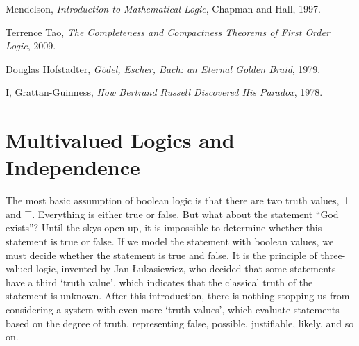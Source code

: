 \begin{thebibliography}{9}

    Mendelson,
    \emph{Introduction to Mathematical Logic},
    Chapman and Hall,
    1997.

    Terrence Tao,
    \emph{The Completeness and Compactness Theorems of First Order Logic},
    2009.

    Douglas Hofstadter,
    \emph{G\"{o}del, Escher, Bach: an Eternal Golden Braid},
    1979.

    I, Grattan-Guinness,
    \emph{How Bertrand Russell Discovered His Paradox},
    1978.

\end{thebibliography}



















\section{Multivalued Logics and Independence}

The most basic assumption of boolean logic is that there are two truth values, $\bot$ and $\top$. Everything is either true or false. But what about the statement ``God exists''? Until the skys open up, it is impossible to determine whether this statement is true or false. If we model the statement with boolean values, we must decide whether the statement is true and false. It is the principle of three-valued logic, invented by Jan \L ukasiewicz, who decided that some statements have a third `truth value', which indicates that the classical truth of the statement is unknown. After this introduction, there is nothing stopping us from considering a system with even more `truth values', which evaluate statements based on the degree of truth, representing false, possible, justifiable, likely, and so on.

